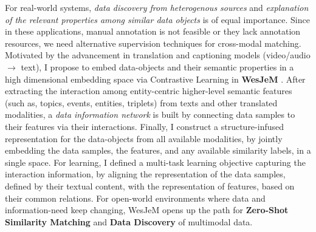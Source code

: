 For real-world systems, \textit{data discovery 
from heterogenous sources} %
and \textit{explanation of the relevant properties among similar data objects} is of equal importance. 
Since in these applications, manual annotation is not feasible or they lack annotation resources, we need alternative supervision techniques for cross-modal matching. 
%
Motivated by the advancement in translation and captioning models (video/audio $\rightarrow$ text), I propose to embed data-objects and their semantic properties in a high dimensional embedding space via Contrastive Learning in \textbf{WesJeM} \cite{solaiman2022open}. 
After extracting the interaction among entity-centric higher-level semantic features (such as, topics, events, entities, triplets) from texts and other translated modalities, a \textit{data information network} is built by connecting data samples to
their features via their interactions.
Finally, I construct a structure-infused representation for the data-objects from all available modalities, by jointly embedding the data samples, the features, and any available similarity labels, 
in a single space.
%
For learning, I defined a multi-task learning objective capturing the interaction information,
by aligning the
representation of the data samples, defined by their textual content, with the representation of features, based on their common relations. 
%
For open-world environments where data and information-need keep changing, %
WesJeM opens up the path for \textbf{Zero-Shot Similarity Matching} and \textbf{Data Discovery} of multimodal data.
